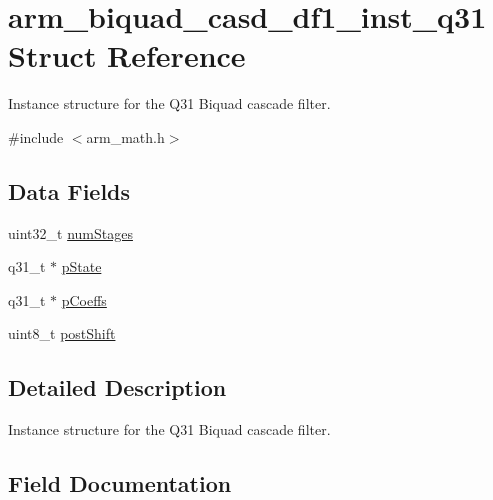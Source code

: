 \hypertarget{structarm__biquad__casd__df1__inst__q31}{}\section{arm\+\_\+biquad\+\_\+casd\+\_\+df1\+\_\+inst\+\_\+q31 Struct Reference}
\label{structarm__biquad__casd__df1__inst__q31}


Instance structure for the Q31 Biquad cascade filter.  




{\ttfamily \#include $<$arm\+\_\+math.\+h$>$}

\subsection*{Data Fields}
\begin{DoxyCompactItemize}
\item 
uint32\+\_\+t \mbox{\hyperlink{structarm__biquad__casd__df1__inst__q31_aed9c8a6224cd149e8e12b17b25b9b767}{num\+Stages}}
\item 
q31\+\_\+t $\ast$ \mbox{\hyperlink{structarm__biquad__casd__df1__inst__q31_adee4ba3ee8869865af7d8fa08ca913d6}{p\+State}}
\item 
q31\+\_\+t $\ast$ \mbox{\hyperlink{structarm__biquad__casd__df1__inst__q31_a68888e36167d81cb7836db10367a1682}{p\+Coeffs}}
\item 
uint8\+\_\+t \mbox{\hyperlink{structarm__biquad__casd__df1__inst__q31_a74050e9f36542bd56f4052381a82ae8f}{post\+Shift}}
\end{DoxyCompactItemize}


\subsection{Detailed Description}
Instance structure for the Q31 Biquad cascade filter. 

\subsection{Field Documentation}
\mbox{\label{structarm__biquad__casd__df1__inst__q31_aed9c8a6224cd149e8e12b17b25b9b767}} 
